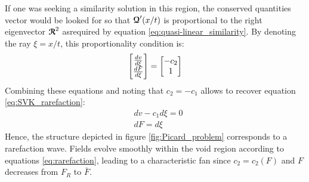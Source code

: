 \begin{remark}
  If one was seeking a similarity solution in this region, the conserved quantities vector would be looked for so that ${\boldsymbol{\mathcal{Q}}}'(x/t)$ is proportional to the right eigenvector ${\boldsymbol{\mathcal{R}}}^2$ asrequired by equation \eqref{eq:quasi-linear_similarity}. By denoting the ray $\xi=x/t$, this proportionality condition is:
  \begin{equation*}
    \left[\begin{matrix}\frac{d v}{d \xi} \\ \frac{d F}{d \xi}\end{matrix}\right] = \left[\begin{matrix} -c_2 \\ 1\end{matrix}\right]
  \end{equation*}
  Combining  these equations and noting that $c_2=-c_1$ allows to recover equation \eqref{eq:SVK_rarefaction}:
  \begin{equation}
    \label{eq:rarefaction}
    \begin{aligned}
      & dv -c_1 d\xi = 0\\
      & dF = d\xi
    \end{aligned}
  \end{equation}
Hence, the structure depicted in figure \ref{fig:Picard_problem} corresponds to a rarefaction wave. Fields evolve smoothly within the void region according to equations \eqref{eq:rarefaction}, leading to a characteristic fan since $c_2=c_2(F)$ and $F$ decreases from $F_R$ to $\bar{F}$.
\end{remark}


